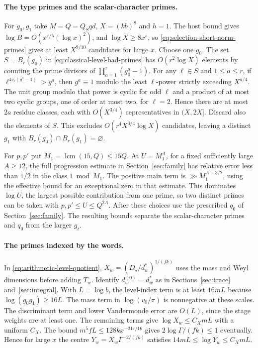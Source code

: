 \paragraph{The type primes and the scalar-character primes.}
For \(g_0,g_1\) take \(M=Q=Q_Sqd\), \(X=(kb)^8\) and \(h=1\).
The host bound gives \(\log B=O(x^{\varepsilon/5}(\log x)^2)\), and
\(\log X\ge8x^\varepsilon\), so \eqref{eq:selection-short-norm-primes}
gives at least \(X^{9/10}\) candidates for large \(x\). Choose one
\(g_0\). The set \(S=B_r(g_0)\) in \eqref{eq:classical-level-bad-primes}
has \(O(r^2\log X)\) elements by counting the prime divisors of
\(\prod_{a=1}^r(g_0^a-1)\). For any \(\ell\in S\) and \(1\le a\le r\),
if \(\ell^{4v_\ell(g^a-1)}>g^a\), then \(g^a\equiv1\) modulo the
least \(\ell\)-power strictly exceeding \(X^{a/4}\). The unit group
modulo that power is cyclic for odd \(\ell\) and a product of at most
two cyclic groups, one of order at most two, for \(\ell=2\). Hence
there are at most \(2a\) residue classes, each with \(O(X^{3/4})\)
representatives in \((X,2X]\). Discard also the elements of \(S\).
This excludes \(O(r^4X^{3/4}\log X)\) candidates, leaving a distinct
\(g_1\) with \(B_r(g_0)\cap B_r(g_1)=\varnothing\).

For \(p,p'\) put \(M_1=\operatorname{lcm}(15,Q)\le15Q\). At
\(U=M_1^A\), for a fixed sufficiently large \(A\ge12\), the full
progression estimate in Section~\ref{sec:family} has relative error
less than \(1/2\) in the class \(1\bmod M_1\). The positive main term
is \(\gg M_1^{A-3/2}\), using the effective bound for an exceptional
zero in that estimate. This dominates \(\log U\), the largest possible
contribution from one prime, so two distinct primes can be taken with
\(p,p'\le U\le Q^{2A}\). After these choices use the prescribed
\(q_0\) of Section~\ref{sec:family}. The resulting bounds separate
the scalar-character primes and \(q_0\) from the larger \(g_i\).
\cite[arXiv v2, (1.2), (1.7) and Corollary~1.4]{f1thorner-zaman}

\paragraph{The primes indexed by the words.}
%
In \eqref{eq:arithmetic-level-quotient}, \(X_w=(D_\star/d_w^*)^{1/(fk)}\)
uses the mass and Weyl dimensions before adding \(T_w\). Identify
\(d_w^{(0)}=d_w^*\) as in Sections~\ref{sec:trace} and~\ref{sec:integral}.
With \(L=\log b\), the level-index term is at least \(16mL\) because
\(\log(g_0g_1)\ge16L\). The mass term in \(\log(v_0/\pi)\) is
nonnegative at these scales. The discriminant term and lower
Vandermonde error are \(O(L)\), since the stage weights are at least one. The
remaining terms give \(\log X_w\le C_XmL\) with a uniform \(C_X\).
The bound \(m^5fL\le128kx^{-21\varepsilon/16}\) gives
\(2\log\Gamma/(fk)\le1\) eventually. Hence for large \(x\) the centre
\(Y_w=X_w\Gamma^{-2/(fk)}\) satisfies
\(14mL\le\log Y_w\le C_XmL\).

